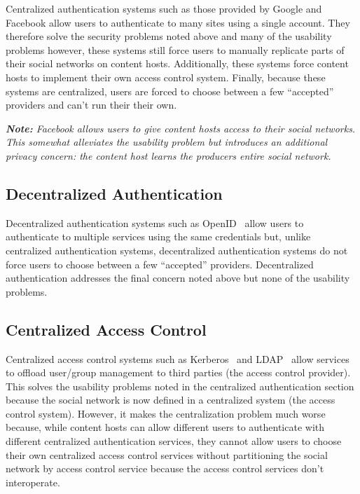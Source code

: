 \documentclass[pdftex,12pt,a4papaer]{article}
\newcommand{\note}[1]{\textit{\textbf{Note:} #1}}
\begin{document}
Centralized authentication systems such as those provided by Google and Facebook
allow users to authenticate to many sites using a single account. They therefore solve
the security problems noted above and many of the usability problems however,
these systems still force users to manually replicate parts of their social
networks on content hosts. Additionally, these systems force content hosts to
implement their own access control system.  Finally, because these systems are
centralized, users are forced to choose between a few ``accepted'' providers and
can't run their their own.

\note{Facebook allows users to give content hosts access to their social
networks. This somewhat alleviates the usability problem but introduces an
additional privacy concern: the content host learns the producers entire
social network.}

\subsection{Decentralized Authentication}

Decentralized authentication systems such as OpenID~\cite{openid} allow users to
authenticate to multiple services using the same credentials but, unlike centralized
authentication systems, decentralized authentication systems do not force users
to choose between a few ``accepted'' providers. Decentralized authentication
addresses the final concern noted above but none of the usability problems.

\subsection{Centralized Access Control}

Centralized access control systems such as Kerberos~\cite{kerberos} and
LDAP~\cite{ldap} allow services to offload user/group management to third
parties (the access control provider). This solves the usability problems noted
in the centralized authentication section because the social network is now
defined in a centralized system (the access control system). However, it makes
the centralization problem much worse because, while content hosts can allow
different users to authenticate with different centralized authentication
services, they cannot allow users to choose their own centralized
access control services without partitioning the social network by access
control service because the access control services don't interoperate.
\end{document}
